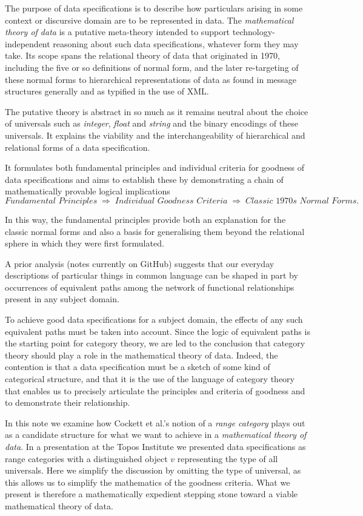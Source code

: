 

The purpose of data specifications is to describe how particulars arising in some context or discursive domain
are to be represented in data. 
The \textit{mathematical theory of data} is a putative meta-theory 
intended to support technology-independent reasoning about such data specifications, whatever form they may take. 
Its scope spans the relational theory of data that originated in 1970, including the five or so definitions of normal form,
and the later re-targeting of these normal forms to hierarchical representations 
of data as found in message structures generally and as typified in the use of XML.

The putative theory is abstract in so much as it remains neutral about the choice of universals such as \textit{integer}, \textit{float} and \textit{string} and the binary encodings of these universals. 
It explains the viability and the interchangeability of hierarchical and relational forms of a data specification.  

It formulates both fundamental principles and individual criteria for goodness of data specifications and aims to establish these by demonstrating a chain of mathematically provable logical implications 
\[
\textit{Fundamental Principles}
\;\Longrightarrow\;
\textit{Individual Goodness Criteria}
\;\Longrightarrow\;
\textit{Classic 1970s Normal Forms}.
\]
 
In this way, the fundamental principles provide both an explanation for the classic normal forms and also a basis for generalising them beyond the relational sphere in which they were first formulated.

A prior analysis (notes currently on GitHub) suggests that our everyday descriptions of particular things in common language can be shaped in part by  occurrences of equivalent paths among the network of functional relationships present in any subject domain. 

To achieve good data specifications for a subject domain, the effects of any such equivalent paths must be taken into account. 
Since the logic of equivalent paths is the starting point for category theory, we are led to the conclusion that 
category theory should play a role in the mathematical theory of data. Indeed, the contention is that
a data specification must be a sketch of some kind of categorical structure, 
and that it is the use of the language of category theory that enables us to precisely articulate 
the principles and criteria of goodness and to demonstrate their relationship.

In this note we examine how Cockett et al.'s notion of a \emph{range category} plays out as a candidate structure for what we want to achieve in a \textit{mathematical theory of data}. In a presentation at the Topos Institute 
we presented data specifications as range categories with a distinguished object $v$ representing the type of all universals. Here we simplify the discussion by omitting the type of universal, 
as this allows us to simplify the mathematics of the goodness criteria.
What we present is therefore a mathematically expedient stepping stone toward a viable mathematical theory of data.
